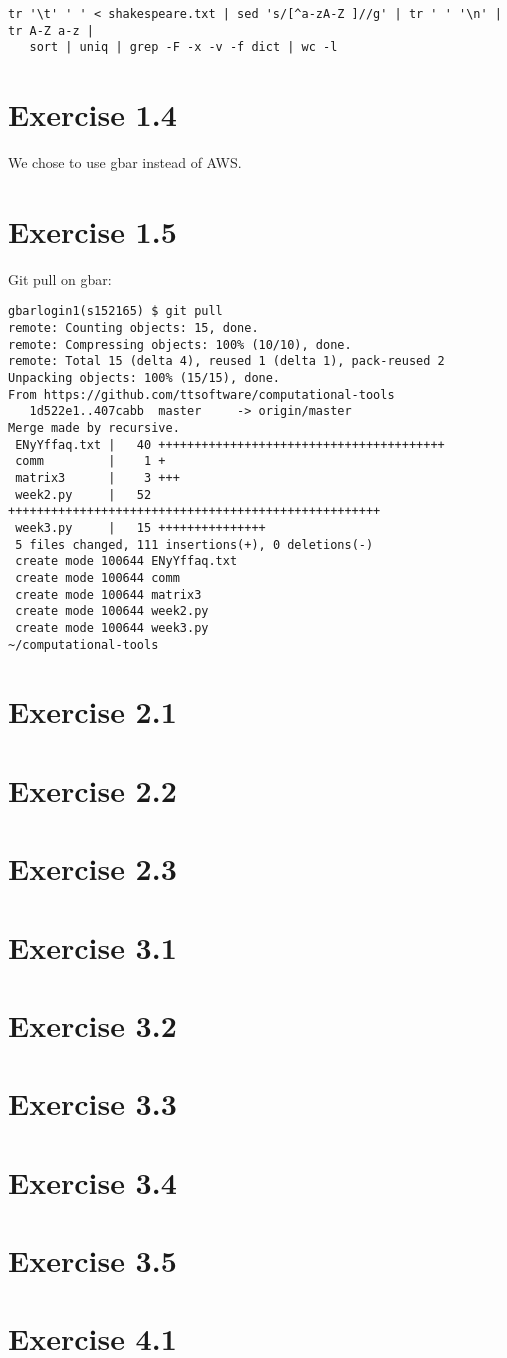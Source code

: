 \documentclass{article}
\begin{document}
\begin{verbatim}
tr '\t' ' ' < shakespeare.txt | sed 's/[^a-zA-Z ]//g' | tr ' ' '\n' | tr A-Z a-z | 
   sort | uniq | grep -F -x -v -f dict | wc -l
\end{verbatim}


\section{Exercise 1.4}

We chose to use gbar instead of AWS.

\section{Exercise 1.5}

Git pull on gbar: 

\begin{lstlisting}
gbarlogin1(s152165) $ git pull
remote: Counting objects: 15, done.
remote: Compressing objects: 100% (10/10), done.
remote: Total 15 (delta 4), reused 1 (delta 1), pack-reused 2
Unpacking objects: 100% (15/15), done.
From https://github.com/ttsoftware/computational-tools
   1d522e1..407cabb  master     -> origin/master
Merge made by recursive.
 ENyYffaq.txt |   40 ++++++++++++++++++++++++++++++++++++++++
 comm         |    1 +
 matrix3      |    3 +++
 week2.py     |   52 ++++++++++++++++++++++++++++++++++++++++++++++++++++
 week3.py     |   15 +++++++++++++++
 5 files changed, 111 insertions(+), 0 deletions(-)
 create mode 100644 ENyYffaq.txt
 create mode 100644 comm
 create mode 100644 matrix3
 create mode 100644 week2.py
 create mode 100644 week3.py
~/computational-tools
\end{lstlisting}

\section{Exercise 2.1}
\section{Exercise 2.2}
\section{Exercise 2.3}

\section{Exercise 3.1}
\section{Exercise 3.2}
\section{Exercise 3.3}
\section{Exercise 3.4}
\section{Exercise 3.5}

\section{Exercise 4.1}
\end{document}
